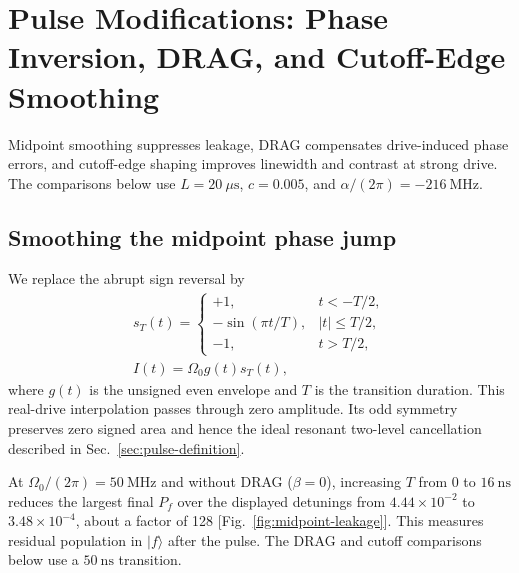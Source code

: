 \section{Pulse Modifications: Phase Inversion, DRAG, and Cutoff-Edge Smoothing}
\label{sec:pulse-modifications}

Midpoint smoothing suppresses leakage, DRAG compensates drive-induced
phase errors, and cutoff-edge shaping improves linewidth and contrast
at strong drive. The comparisons below use $L=20~\mu\mathrm{s}$,
$c=0.005$, and $\alpha/(2\pi)=-216~\mathrm{MHz}$.

\subsection{Smoothing the midpoint phase jump}

We replace the abrupt sign reversal by
\begin{equation}
    \begin{gathered}
    s_T(t)=
    \begin{cases}
        +1, & t<-T/2,\\
        -\sin(\pi t/T), & |t|\leq T/2,\\
        -1, & t>T/2,
    \end{cases}
    \\
    I(t)=\Omega_0 g(t)s_T(t),
    \end{gathered}
    \label{eq:pulse-modification-sign}
\end{equation}
where $g(t)$ is the unsigned even envelope and $T$ is the transition
duration. This real-drive interpolation passes through zero amplitude.
Its odd symmetry preserves zero signed area and hence the ideal resonant
two-level cancellation described in Sec.~\ref{sec:pulse-definition}.

At $\Omega_0/(2\pi)=50~\mathrm{MHz}$ and without DRAG ($\beta=0$),
increasing $T$ from 0 to $16~\mathrm{ns}$ reduces the largest final $P_f$
over the displayed detunings from $4.44\times10^{-2}$ to
$3.48\times10^{-4}$, about a factor of 128
[Fig.~\ref{fig:midpoint-leakage}]. This measures residual population
in $|f\rangle$ after the pulse. The DRAG and cutoff comparisons below
use a $50~\mathrm{ns}$ transition.

